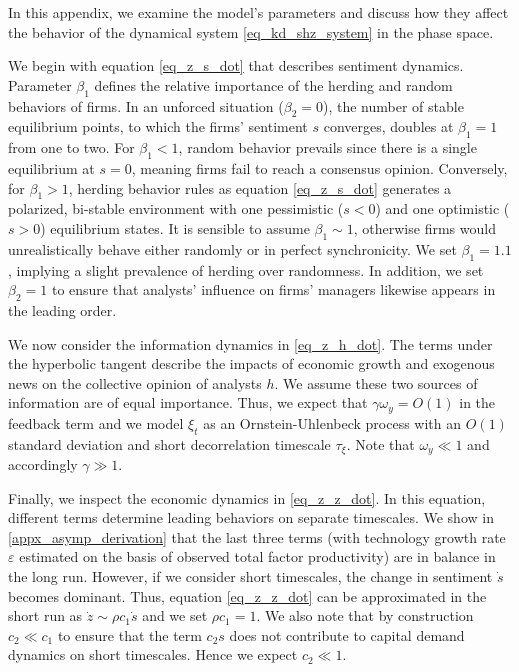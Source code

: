 In this appendix, we examine the model's parameters and discuss how they affect the behavior of the dynamical system \eqref{eq_kd_shz_system} in the phase space.

We begin with equation \eqref{eq_z_s_dot} that describes sentiment dynamics. Parameter $\beta_1$ defines the relative importance of the herding and random behaviors of firms. In an unforced situation ($\beta_2=0$), the number of stable equilibrium points, to which the firms' sentiment $s$ converges, doubles at $\beta_1=1$ from one to two. For $\beta_1<1$, random behavior prevails since there is a single equilibrium at $s=0$, meaning firms fail to reach a consensus opinion. Conversely, for $\beta_1>1$, herding behavior rules as equation \eqref{eq_z_s_dot} generates a polarized, bi-stable environment with one pessimistic ($s<0$) and one optimistic ($s>0$) equilibrium states. It is sensible to assume $\beta_1\sim1$, otherwise firms would unrealistically behave either randomly or in perfect synchronicity. We set $\beta_1=1.1$, implying a slight prevalence of herding over randomness. In addition, we set $\beta_2=1$ to ensure that analysts' influence on firms' managers likewise appears in the leading order. 

We now consider the information dynamics in \eqref{eq_z_h_dot}. The terms under the hyperbolic tangent describe the impacts of economic growth and exogenous news on the collective opinion of analysts $h$. We assume these two sources of information are of equal importance. Thus, we expect that $\gamma\omega_y=O(1)$ in the feedback term and we model $\xi_t$ as an Ornstein-Uhlenbeck process with an $O(1)$ standard deviation and short decorrelation timescale $\tau_\xi$. Note that $\omega_y\ll1$ and accordingly $\gamma\gg1$. 

Finally, we inspect the economic dynamics in \eqref{eq_z_z_dot}. In this equation, different terms determine leading behaviors on separate timescales. We show in \ref{appx_asymp_derivation} that the last three terms (with technology growth rate $\varepsilon$ estimated on the basis of observed total factor productivity) are in balance in the long run. However, if we consider short timescales, the change in sentiment $\dot{s}$ becomes dominant. Thus, equation \eqref{eq_z_z_dot} can be approximated in the short run as $\dot{z}\sim \rho c_1\dot{s}$ and we set $\rho c_1=1$. We also note that by construction $c_2\ll c_1$ to ensure that the term $c_2s$ does not contribute to capital demand dynamics on short timescales. Hence we expect $c_2\ll 1$.  

